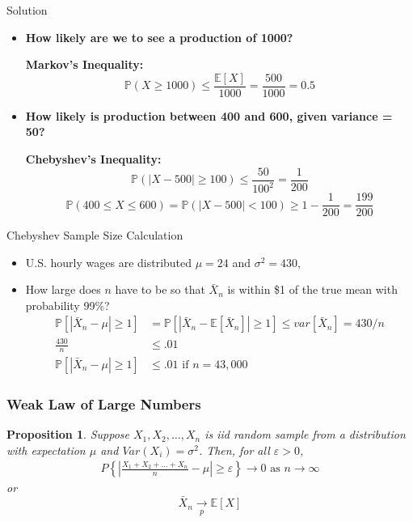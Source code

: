 \documentclass[handout, aspectratio=169]{beamer}
\newtheorem{prop}{Proposition}
\numberwithin{equation}{section}
\begin{document}

\begin{frame}{Solution}
\begin{itemize}
\item \textbf{How likely are we to see a production of 1000?}

\textbf{Markov's Inequality:}
\[
\mathbb{P}(X \geq 1000) \leq \frac{\mathbb{E}[X]}{1000} = \frac{500}{1000} = 0.5
\]

\pause

\item \textbf{How likely is production between 400 and 600, given variance = 50?}

\textbf{Chebyshev's Inequality:}
\[
\mathbb{P}(|X - 500| \geq 100) \leq \frac{50}{100^2} = \frac{1}{200}
\]
\[
\mathbb{P}(400 \leq X \leq 600) = \mathbb{P}(|X - 500| < 100) \geq 1 - \frac{1}{200} = \frac{199}{200}
\]
\end{itemize}
\end{frame}


\begin{frame}{Chebyshev Sample Size Calculation}
\begin{itemize}
\item U.S. hourly wages are distributed $\mu=24$ and $\sigma^2=430$,
\item How large does $n$ have to be so that $\bar{X}_n$ is within \$1 of the true mean with probability 99\%?
\begin{align*}
\mathbb{P}\left[|\bar{X}_n-\mu|\geq 1\right]&=\mathbb{P}\left[|\bar{X}_n-\mathbb{E}\left[\bar{X}_n\right]|\geq 1\right]\leq var\left[\bar{X}_n\right]=430/n\\
\frac{430}{n}&\leq .01\\
\mathbb{P}\left[|\bar{X}_n-\mu|\geq 1\right]&\leq .01 \text{ if }n=43{,}000
\end{align*}
\end{itemize}

\end{frame}


\begin{frame}
\frametitle{Weak Law of Large Numbers}

\begin{prop}
Suppose $X_{1}, X_{2}, \hdots, X_{n}$ is iid random sample from a distribution with expectation $\mu$ and $Var(X_{i})= \sigma^2$.  Then, for all $\varepsilon >0$,
\begin{eqnarray}
P\left\{ \left| \frac{X_{1} + X_{2} + \hdots + X_{n} }{n} -\mu \right| \geq \varepsilon \right\} \rightarrow 0 \text{ as } n \rightarrow \infty \nonumber
\end{eqnarray}
or  $$\bar{X}_n\underset{p}{\to} \mathbb{E}[X]$$
\end{prop}


\end{frame}
\end{document}
